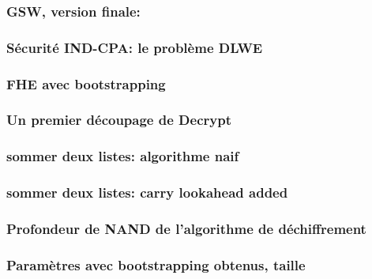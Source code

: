 \documentclass[15pt,usenames,dvipsnames]{beamer}
\begin{document}

\begin{frame} 
\frametitle{GSW, version finale:}
\end{frame} 


\begin{frame} 
\frametitle{Sécurité IND-CPA: le problème DLWE}
\end{frame} 


\begin{frame} 
\frametitle{FHE avec bootstrapping}
\end{frame} 


\begin{frame} 
\frametitle{Un premier découpage de Decrypt}
\end{frame} 


\begin{frame} 
\frametitle{sommer deux listes: algorithme naif}
\end{frame} 
    

\begin{frame} 
\frametitle{sommer deux listes: carry lookahead added}
\end{frame} 

\begin{frame} 
\frametitle{Profondeur de NAND de l'algorithme de déchiffrement}
\end{frame} 


\begin{frame} 
\frametitle{Paramètres avec bootstrapping obtenus, taille}
\end{frame} 
\end{document}
